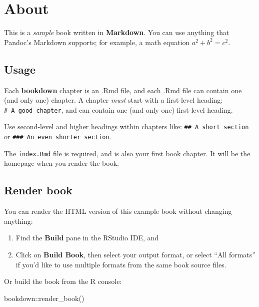 \documentclass[
]{book}
\newenvironment{Shaded}{\begin{snugshade}}{\end{snugshade}}
\newcommand{\FunctionTok}[1]{\textcolor[rgb]{0.00,0.00,0.00}{#1}}
\newcommand{\NormalTok}[1]{#1}
\newcommand{\SpecialCharTok}[1]{\textcolor[rgb]{0.00,0.00,0.00}{#1}}
\theoremstyle{definition}
\theoremstyle{definition}
\theoremstyle{definition}
\theoremstyle{definition}
\theoremstyle{remark}
\begin{document}
\hypertarget{about}{%
\section{About}\label{about}}

This is a \emph{sample} book written in \textbf{Markdown}. You can use anything that Pandoc's Markdown supports; for example, a math equation \(a^2 + b^2 = c^2\).

\hypertarget{usage}{%
\subsection{Usage}\label{usage}}

Each \textbf{bookdown} chapter is an .Rmd file, and each .Rmd file can contain one (and only one) chapter. A chapter \emph{must} start with a first-level heading: \texttt{\#\ A\ good\ chapter}, and can contain one (and only one) first-level heading.

Use second-level and higher headings within chapters like: \texttt{\#\#\ A\ short\ section} or \texttt{\#\#\#\ An\ even\ shorter\ section}.

The \texttt{index.Rmd} file is required, and is also your first book chapter. It will be the homepage when you render the book.

\hypertarget{render-book}{%
\subsection{Render book}\label{render-book}}

You can render the HTML version of this example book without changing anything:

\begin{enumerate}
\def\labelenumi{\arabic{enumi}.}
\item
  Find the \textbf{Build} pane in the RStudio IDE, and
\item
  Click on \textbf{Build Book}, then select your output format, or select ``All formats'' if you'd like to use multiple formats from the same book source files.
\end{enumerate}

Or build the book from the R console:

\begin{Shaded}
\begin{Highlighting}[]
\NormalTok{bookdown}\SpecialCharTok{::}\FunctionTok{render\_book}\NormalTok{()}
\end{Highlighting}
\end{Shaded}
\end{document}
